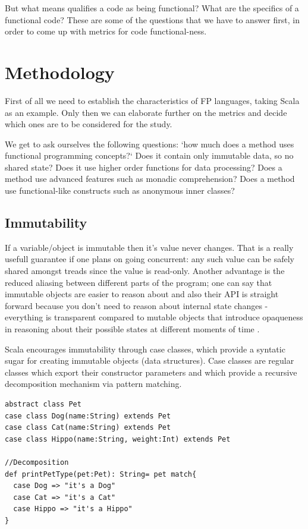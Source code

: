 \documentclass{article}
\begin{document}
But what means qualifies a code as being functional? What are the specifics of a functional code? These are some of the questions that we have to answer first, in order to come up with metrics for code functional-ness.

\section {Methodology}
First of all we need to establish the characteristics of FP languages, taking Scala as an example. Only then we can elaborate further on the metrics and decide which ones are to be considered for the study. \par

We get to ask ourselves the following questions: `how much does a method uses functional programming concepts?` Does it contain only immutable data, so no shared state? Does it use higher order functions for data processing? Does a method use advanced features such as monadic comprehension? Does a method use functional-like constructs such as anonymous inner classes? \par

\subsection {Immutability}
If a variable/object is immutable then it's value never changes. That is a really usefull guarantee if one plans on going concurrent: any such value can be safely shared amongst treads since the value is read-only. Another advantage is the reduced aliasing between different parts of the program; one can say that immutable objects are easier to reason about and also their API is straight forward because you don't need to reason about internal state changes - everything is transparent compared to mutable objects that introduce opaqueness in reasoning about their possible states at different moments of time . \par
Scala encourages immutability through case classes, which provide a syntatic sugar for creating immutable objects (data structures). Case classes are regular classes which export their constructor parameters and which provide a recursive decomposition mechanism via pattern matching.

\begin{lstlisting} 
abstract class Pet
case class Dog(name:String) extends Pet 
case class Cat(name:String) extends Pet
case class Hippo(name:String, weight:Int) extends Pet

//Decomposition
def printPetType(pet:Pet): String= pet match{
  case Dog => "it's a Dog"
  case Cat => "it's a Cat"
  case Hippo => "it's a Hippo"
}
\end{lstlisting}
\end{document}

